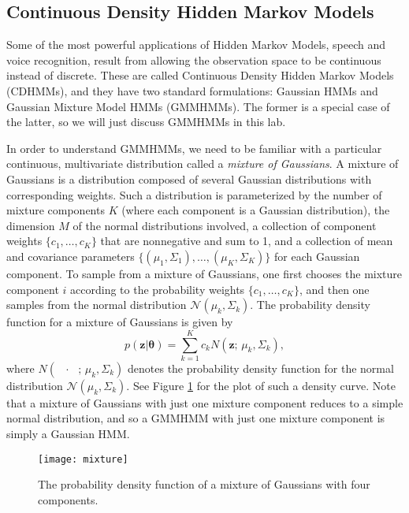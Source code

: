 
\subsection{Continuous Density Hidden Markov Models}
Some of the most powerful applications of Hidden Markov Models, speech and voice recognition, result from allowing the observation space to be continuous instead of discrete.
These are called Continuous Density Hidden Markov Models (CDHMMs), and they have two standard formulations: Gaussian HMMs and Gaussian Mixture Model HMMs (GMMHMMs).
The former is a special case of the latter, so we will just discuss GMMHMMs in this lab.

In order to understand GMMHMMs, we need to be familiar with a particular continuous, multivariate distribution called a \emph{mixture of Gaussians}.
A mixture of Gaussians is a distribution composed of several Gaussian distributions with corresponding weights.
Such a distribution is parameterized by the number of mixture components $K$ (where each component is a Gaussian distribution), the dimension $M$ of the normal distributions involved, a collection of component weights
$\{c_1, \ldots, c_K\}$ that are nonnegative and sum to 1, and a collection of mean and covariance parameters $\{(\mu_1,\Sigma_1), \ldots, (\mu_K,\Sigma_K)\}$ for each Gaussian
component. To sample from a mixture of Gaussians, one first chooses the mixture component $i$ according to the probability weights $\{c_1,\ldots,c_K\}$, and then one
samples from the normal distribution $\mathcal{N}(\mu_k, \Sigma_k)$. The probability density function for a mixture of Gaussians is given by
\[
p(\mathbf{z}|\mathbf{\theta}) = \sum_{k=1}^K c_kN(\mathbf{z};\,\mu_k,\Sigma_k),
\]
where $N(\text{ } \cdot \text{ };\,\mu_k,\Sigma_k)$ denotes the probability density function for the normal distribution $\mathcal{N}(\mu_k, \Sigma_k)$.
See Figure \ref{fig:mixture} for the plot of such a density curve.
Note that a mixture of Gaussians with just one mixture component reduces to a simple normal distribution, and so a GMMHMM with just one mixture component
is simply a Gaussian HMM.

\begin{figure}
\centering
\texttt{[image: mixture]}
\caption{The probability density function of a mixture of Gaussians with four components.}
\label{fig:mixture}
\end{figure}


